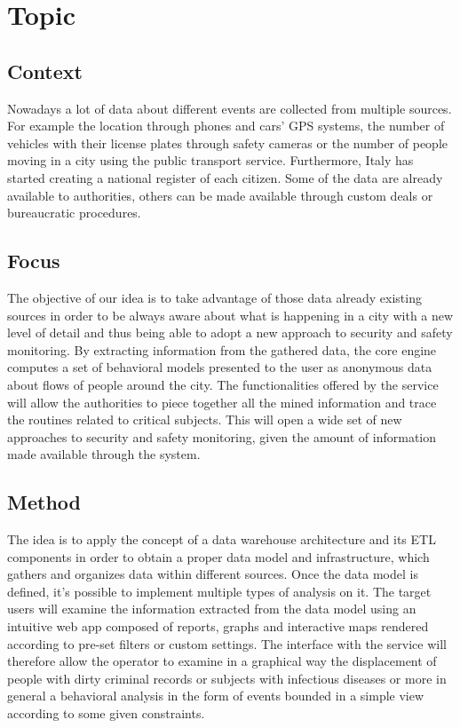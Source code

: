 \documentclass[../main.tex]{subfiles}
\begin{document}
    \chapter{Topic}
    \section{Context}
    Nowadays a lot of data about different events are collected from multiple sources. For example the location through phones and cars’ GPS systems, the number of vehicles with their license plates through safety cameras or the number of people moving in a city using the public transport service. Furthermore, Italy has started creating a national register of each citizen. Some of the data are already available to authorities, others can be made available through custom deals or bureaucratic procedures.


    \section{Focus}
    The objective of our idea is to take advantage of those data already existing sources in order to be always aware about what is happening in a city with a new level of detail and thus being able to adopt a new approach to security and safety monitoring. By extracting information from the gathered data, the core engine computes a set of behavioral models presented to the user as anonymous data about flows of people around the city. The functionalities offered by the service will allow the authorities to piece together all the mined information and trace the routines related to critical subjects. This will open a wide set of new approaches to security and safety monitoring, given the amount of information made available through the system.


    \section{Method}
    The idea is to apply the concept of a data warehouse architecture and its ETL components in order to obtain a proper data model and infrastructure, which gathers and organizes data within different sources.
    Once the data model is defined, it’s possible to implement multiple types of analysis on it.
    The target users will examine the information extracted from the data model using an intuitive web app composed of reports, graphs and interactive maps rendered according to pre-set filters or custom settings. The interface with the service will therefore allow the operator to examine in a graphical way the displacement of people with dirty criminal records or subjects with infectious diseases or more in general a behavioral analysis in the form of events bounded in a simple view according to some given constraints.
\end{document}
